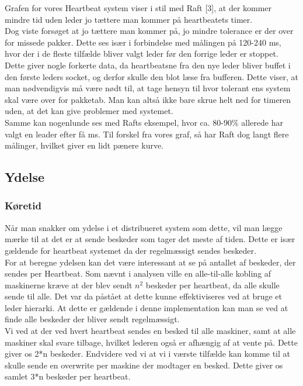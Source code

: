 \documentclass[a4paper,12pt]{article}
\begin{document}
Grafen for vores Heartbeat system viser i stil med Raft [3], at der kommer mindre tid uden leder jo tættere man kommer på heartbeatets timer.
\\
Dog viste forsøget at jo tættere man kommer på, jo mindre tolerance er der over for missede pakker. Dette ses især i forbindelse med målingen på 120-240 ms, hvor der i de fleste tilfælde bliver valgt leder før den forrige leder er stoppet. Dette giver nogle forkerte data, da heartbeatsne fra den nye leder bliver buffet i den første leders socket, og derfor skulle den blot læse fra bufferen. Dette viser, at man nødvendigvis må være nødt til, at tage hensyn til hvor tolerant ens system skal være over for pakketab. Man kan altså ikke bare skrue helt ned for timeren uden, at det kan give problemer med systemet. 
\\
Samme kan nogenlunde ses med Rafts eksempel, hvor ca. 80-90\% allerede har valgt en leader efter få ms. Til forskel fra vores graf, så har Raft dog langt flere målinger, hvilket giver en lidt pænere kurve.

\subsection{Ydelse}
\subsubsection{Køretid}
Når man snakker om ydelse i et distribueret system som dette, vil man lægge mærke til at det er at sende beskeder som tager det meste af tiden. Dette er især gældende for heartbeat systemet da der regelmæssigt sendes beskeder.
\\
For at beregne ydelsen kan det være interessant at se på antallet af beskeder, der sendes per Heartbeat.
Som nævnt i analysen ville en alle-til-alle kobling af maskinerne kræve at der blev sendt $n^2$ beskeder per heartbeat, da alle skulle sende til alle. 
Det var da påstået at dette kunne effektiviseres ved at bruge et leder hierarki.
At dette er gældende i denne implementation kan man se ved at finde alle beskeder der bliver sendt regelmæssigt.
\\
Vi ved at der ved hvert heartbeat sendes en besked til alle maskiner, samt at alle maskiner skal svare tilbage, hvilket lederen også er afhængig af at vente på. Dette giver os 2*n beskeder. Endvidere ved vi at vi i værste tilfælde kan komme til at skulle sende en overwrite per maskine der modtager en besked. Dette giver os samlet 3*n beskeder per heartbeat.
\newpage
\end{document}
